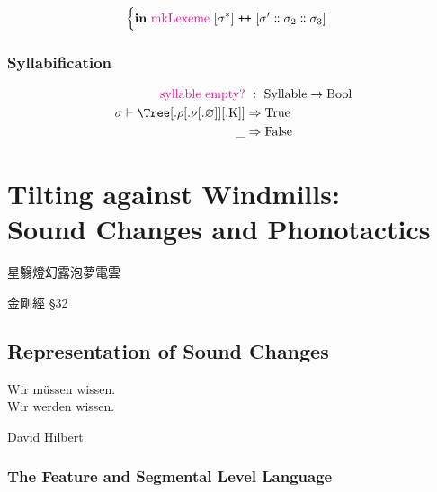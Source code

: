 \documentclass{report}[12pt]
\begin{document}
\begin{align*}
\begin{cases}
\begin{aligned}
                                                                                     & \textbf{in}\ \text{\textcolor{magenta}{mkLexeme}}\ [\sigma^{*}]\ \texttt{++}\ [\sigma' \dblcolon \sigma_2 \dblcolon \sigma_3] \\
                                                                                   \end{aligned} \\
                                                      \end{cases}
\end{align*}

\subsection{Syllabification}

\begin{align*}
  \text{\textcolor{magenta}{syllable empty?}} &\ :\ \text{Syllable} \rightarrow \text{Bool} \\
  \sigma \vdash \Tree [.\text{$\rho$} [.\text{$\nu$} [.\text{$\varnothing$} ] ] [.\text{K} ] ] & \Rightarrow \text{True} \\
  \_ & \Rightarrow \text{False} \\
\end{align*}

\chapter{Tilting against Windmills: \\ Sound Changes and Phonotactics}

\epigraph{星翳燈幻露泡夢電雲\footnotemark}{金剛經 \S32}

\section{Representation of Sound Changes}

\epigraph{Wir m\"{u}ssen wissen. \\ Wir werden wissen.}{David Hilbert}

\subsection{The Feature and Segmental Level Language}
\end{document}
